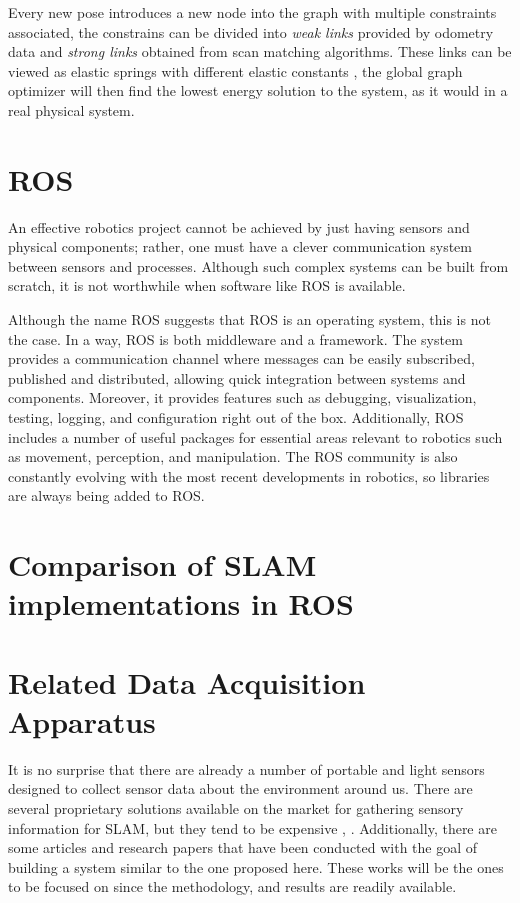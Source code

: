 Every new pose introduces a new node into the graph with multiple constraints associated, the constrains can be divided into \textit{weak links} provided by odometry data and \textit{strong links} obtained from scan matching algorithms. These links can be viewed as elastic springs with different elastic constants \cite{lu_globally_1997}, the global graph optimizer will then find the lowest energy solution to the system, as it would in a real physical system. 


\section{\acs{ROS}}

An effective robotics project cannot be achieved by just having sensors and physical components; rather, one must have a clever communication system between sensors and processes. Although such complex systems can be built from scratch, it is not worthwhile when software like \acs*{ROS} is available.

Although the name \acl*{ROS} suggests that ROS is an operating system, this is not the case.  In a way, \acs*{ROS} is both middleware and a framework. The system provides a communication channel where messages can be easily subscribed, published and distributed, allowing quick integration between systems and components. Moreover, it provides features such as debugging, visualization, testing, logging, and configuration right out of the box. Additionally, ROS includes a number of useful packages for essential areas relevant to robotics such as movement, perception, and manipulation. The ROS community is also constantly evolving with the most recent developments in robotics, so libraries are always being added to ROS.%

\section{Comparison of \acs*{SLAM} implementations in \acs*{ROS}}



\section{Related Data Acquisition Apparatus}

It is no surprise that there are already a number of portable and light sensors designed to collect sensor data about the environment around us. There are several proprietary solutions available on the market for gathering sensory information for \acs*{SLAM}, but they tend to be expensive \cite{libackpack_C50}, \cite{libackpack_DGC50}. Additionally, there are some articles and research papers that have been conducted with the goal of building a system similar to the one proposed here. These works will be the ones to be focused on since the methodology, and results are readily available.

